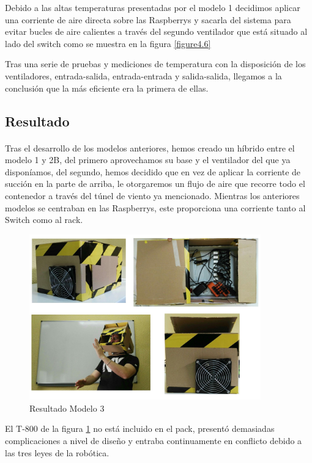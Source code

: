 Debido a las altas temperaturas presentadas por el modelo 1 decidimos aplicar una corriente de aire directa sobre las Raspberrys y sacarla del sistema para evitar bucles de aire calientes a través del segundo ventilador que está situado al lado del switch como se muestra en la figura \ref{figure4.6} 

Tras una serie de pruebas y mediciones de temperatura con la disposición de los ventiladores, entrada-salida, entrada-entrada y salida-salida, llegamos a la conclusión que la más eficiente era la primera de ellas.

\subsection{Resultado}
\paragraph{}

Tras el desarrollo de los modelos anteriores, hemos creado un híbrido entre el modelo 1 y 2B, del primero aprovechamos su base y el ventilador del que ya disponíamos, del segundo, hemos decidido que en vez de aplicar la corriente de succión en la parte de arriba, le otorgaremos un flujo de aire que recorre todo el contenedor a través del túnel de viento ya mencionado. Mientras los anteriores modelos se centraban en las Raspberrys, este proporciona una corriente tanto al Switch como al rack. 

\begin{figure}[H]
	\centering
  	\includegraphics[width=100mm]{Modelos/M3Res.jpg}
   	\caption[Resultado Modelo 3]{Resultado Modelo 3}
   \label{figure4.7}
\end{figure}

El T-800 de la figura \ref{figure4.7} no está incluido en el pack, presentó demasiadas complicaciones a nivel de diseño y entraba continuamente en conflicto debido a las tres leyes de la robótica.
